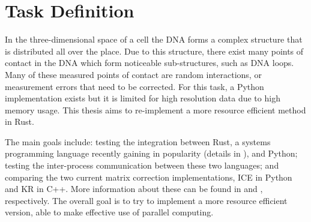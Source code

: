 \section{Task Definition}\label{sec:task}


In the three-dimensional space of a cell the DNA forms a complex structure that is
distributed all over the place. Due to this structure, there exist many points of contact
in the DNA which form noticeable sub-structures, such as DNA loops. Many
of these measured points of contact are random interactions, or measurement errors that
need to be corrected. For this task, a Python implementation exists but it is
limited for high resolution data due to high memory usage. This thesis aims to
re-implement a more resource efficient method in Rust.

The main goals include: testing the integration between Rust, a systems
programming language recently gaining in popularity (details in
), and Python; testing the inter-process communication between these two languages;
and comparing the two current matrix correction implementations, ICE in
Python and KR in C++. More information about these can be found in
 and , respectively. The overall goal is to
try to implement a more resource efficient version, able to make effective use
of parallel computing.

